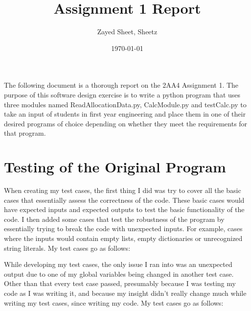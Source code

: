 \documentclass[12pt]{article}
\title{Assignment 1 Report}
\author{Zayed Sheet, Sheetz}
\date{\today}
\begin{document}
\maketitle

The following document is a thorough report on the 2AA4 Assignment 1. The purpose of this software design exercise is to write a python program that uses three modules named ReadAllocationData.py, CalcModule.py and testCalc.py to take an input of students in first year engineering and place them in one of their desired programs of choice depending on whether they meet the requirements for that program.

\section{Testing of the Original Program}

When creating my test cases, the first thing I did was try to cover all the basic cases that essentially assess the correctness of the code.
These basic cases would have expected inputs and expected outputs to test the basic functionality of the code. 
I then added some cases that test the robustness of the program by essentially trying to break the code with unexpected inputs. 
For example, cases where the inputs would contain empty lists, empty dictionaries or unrecognized string literals. My test cases go as follows:

\bigskip
While developing my test cases, the only issue I ran into was an unexpected output due to one of my global variables being changed in another test case.
Other than that every test case passed, presumably because I was testing my code as I was writing it, and because my insight didn't really change much while writing my test cases, since writing my code. My test cases go as follows:
\end{document}
